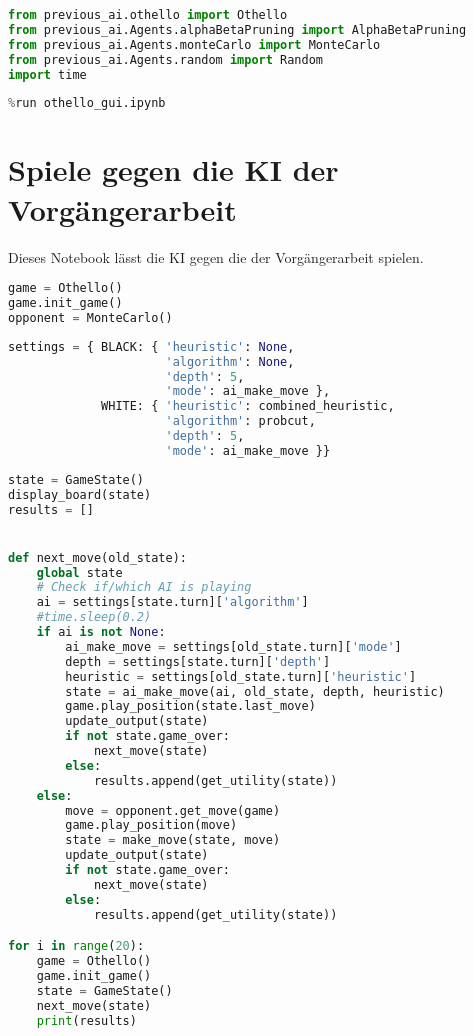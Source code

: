\begin{lstlisting}[language=Python]
from previous_ai.othello import Othello
from previous_ai.Agents.alphaBetaPruning import AlphaBetaPruning
from previous_ai.Agents.monteCarlo import MonteCarlo
from previous_ai.Agents.random import Random
import time
\end{lstlisting}

\begin{lstlisting}[language=Python]
%run othello_ai.ipynb
%run othello_gui.ipynb
\end{lstlisting}

\hypertarget{spiele-gegen-die-ki-der-vorguxe4ngerarbeit}{%
\section{Spiele gegen die KI der
Vorgängerarbeit}\label{spiele-gegen-die-ki-der-vorguxe4ngerarbeit}}

Dieses Notebook lässt die KI gegen die der Vorgängerarbeit spielen.

\begin{lstlisting}[language=Python]
game = Othello()
game.init_game()
opponent = MonteCarlo()
\end{lstlisting}

\begin{lstlisting}[language=Python]
settings = { BLACK: { 'heuristic': None,
                      'algorithm': None,
                      'depth': 5,
                      'mode': ai_make_move },
             WHITE: { 'heuristic': combined_heuristic,
                      'algorithm': probcut,
                      'depth': 5,
                      'mode': ai_make_move }}
\end{lstlisting}

\begin{lstlisting}[language=Python]
state = GameState()
display_board(state)
results = []


def next_move(old_state):
    global state
    # Check if/which AI is playing
    ai = settings[state.turn]['algorithm']
    #time.sleep(0.2)
    if ai is not None:
        ai_make_move = settings[old_state.turn]['mode']
        depth = settings[state.turn]['depth']
        heuristic = settings[old_state.turn]['heuristic']
        state = ai_make_move(ai, old_state, depth, heuristic)
        game.play_position(state.last_move)
        update_output(state)
        if not state.game_over:
            next_move(state)
        else:
            results.append(get_utility(state))
    else:
        move = opponent.get_move(game)
        game.play_position(move)
        state = make_move(state, move)
        update_output(state)
        if not state.game_over:
            next_move(state)
        else:
            results.append(get_utility(state))

for i in range(20):
    game = Othello()
    game.init_game()
    state = GameState()
    next_move(state)
    print(results)
\end{lstlisting}

